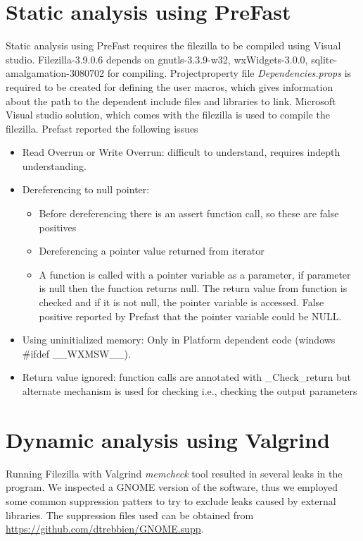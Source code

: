 \documentclass[11pt]{article}
\begin{document}
\section{Static analysis using PreFast}
Static analysis using PreFast requires the filezilla to be compiled using Visual studio. Filezilla-3.9.0.6 depends on gnutls-3.3.9-w32, wxWidgets-3.0.0, sqlite-amalgamation-3080702 for compiling. Projectproperty file \textit{Dependencies.props} is required to be created for defining the user macros, which gives information about the path to the dependent include files and libraries to link. Microsoft Visual studio solution, which comes with the filezilla is used to compile the filezilla.
Prefast reported the following issues
\begin{itemize}[topsep=0pt, itemsep=0pt]
 \item Read Overrun or Write Overrun: difficult to understand, requires indepth understanding.
 \item Dereferencing to null pointer: 
	\begin{itemize}[topsep=0pt, itemsep=0pt]
		\item Before dereferencing there is an assert function call, so these are false positives
		\item Dereferencing a pointer value returned from iterator
		\item A function is called with a pointer variable as a parameter, if parameter is null then the function returns null. The return value from function is checked and if it is not null, the pointer variable is accessed. False positive reported by Prefast that the pointer variable could be NULL.
	\end{itemize}
 \item Using uninitialized memory: Only in Platform dependent code (windows \#ifdef \_\_WXMSW\_\_).
 \item Return value ignored: function calls are annotated with \_Check\_return but alternate mechanism is used for checking i.e., checking the output parameters 
\end{itemize}

\section{Dynamic analysis using Valgrind}

Running Filezilla with Valgrind \textit{memcheck} tool resulted in several leaks in the program. We inspected a GNOME version of the software, thus we employed some common suppression patters to try to exclude leaks caused by external libraries. The suppression files used can be obtained from \url{https://github.com/dtrebbien/GNOME.supp}.
\end{document}
